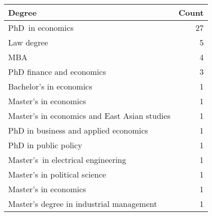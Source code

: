 \begin{tabular}{lr}
\toprule
                                       Degree &  Count \\
\midrule
                             PhD in economics &     27 \\
                                   Law degree &      5 \\
                                          MBA &      4 \\
                    PhD finance and economics &      3 \\
                      Bachelor’s in economics &      1 \\
                        Master’s in economics &      1 \\
 Master’s in economics and East Asian studies &      1 \\
        PhD in business and applied economics &      1 \\
                         PhD in public policy &      1 \\
           Master’s in electrical engineering &      1 \\
                Master’s in political science &      1 \\
                        Master's in economics &      1 \\
     Master’s degree in industrial management &      1 \\
\bottomrule
\end{tabular}
